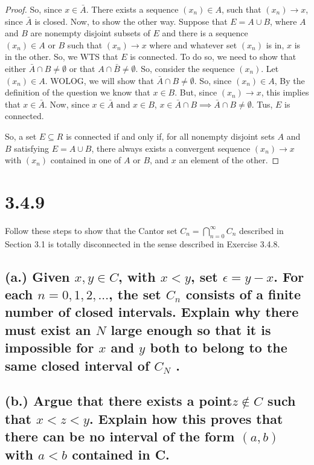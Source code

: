 \documentclass{article}
\begin{document}
\begin{proof}
So, since $x \in \bar{A}$. There exists a sequence $(x_n) \in A$, such that $(x_n) \rightarrow x$, since $\bar{A}$ is closed.
\newline
\newline
Now, to show the other way. Suppose that $E = A \cup B$, where $A$
and $B$ are nonempty disjoint subsets of $E$ and there is a sequence
$(x_n) \in A \text{ or } B$ such that $(x_n) \rightarrow x$ where and whatever
set $(x_n)$ is in, $x$ is in the other.
\newline
\newline
So, we WTS that $E$ is connected. To do so, we need to show that either
$\bar{A} \cap B \ne \emptyset$ or that $A \cap \bar{B} \ne \emptyset$.
 So, consider the sequence $(x_n)$. Let $(x_n) \in A$. WOLOG, we will
 show that $\bar{A} \cap B \ne \emptyset$. So, since $(x_n) \in A$, By 
 the definition of the question we know that $x \in B$. But, since 
 $(x_n) \rightarrow x$, this implies that $x \in \bar{A}$. Now, since
  $x \in \bar{A} \text{ and } x \in B$, $x \in \bar{A} \cap B \implies 
  \bar{A} \cap B \ne \emptyset$. Tus, $E$ is connected.

  So, a set $E \subseteq R$ is connected if and only if, for all nonempty
  disjoint sets $A$ and $B$ satisfying $E = A \cup B$, there always exists a convergent sequence $(x_n) \rightarrow x$ with $(x_n)$ contained in one of $A$ or $B$, and $x$ an element of the other.
   

\end{proof}


\section*{3.4.9}
Follow these steps to show that the Cantor set $ C_n = \bigcap\limits^\infty_{n=0} C_n$ described in Section 3.1 is totally disconnected in the sense described in Exercise 3.4.8.

\subsection*{(a.)  Given $x, y \in C$, with $x < y$, set $\epsilon = y - x$. For each $n = 0, 1, 2,... $, the set $C_n$ consists of a finite number of closed intervals. Explain why there must exist an $N$ large enough so that it is impossible for $x$ and $y$ both to belong to the same closed interval of $C_N$ .}



\subsection*{(b.) Argue that there exists a point$ z \notin C$ such that $x<z<y$. Explain how
this proves that there can be no interval of the form $(a, b)$ with $a<b$ contained
in C.}
\end{document}
